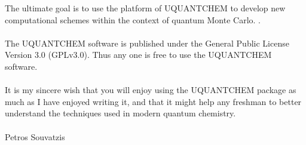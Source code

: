 \documentclass[a4paper,twoside,openany]{book}
\begin{document}
The ultimate goal is to use the platform of UQUANTCHEM to develop new computational schemes within the context of quantum Monte Carlo. . \\ \\
\noindent
The UQUANTCHEM software is published under the General Public License Version 3.0  (GPLv3.0). Thus any one is free to use the  UQUANTCHEM software.
\\ \\
\noindent
It is my sincere wish that you will enjoy using the UQUANTCHEM package as much as I have enjoyed writing it, and that it might help any freshman to better understand 
the techniques used in modern quantum chemistry. \\ \\
\noindent
Petros Souvatzis
\end{document}
